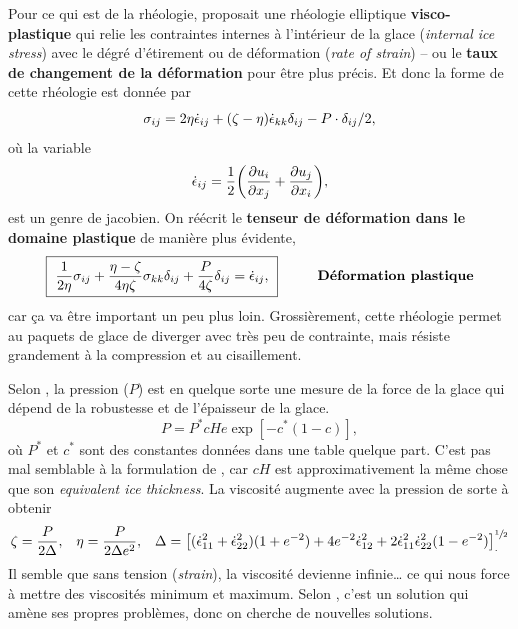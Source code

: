 \documentclass[10pt]{article}
\numberwithin{equation}{section}
\begin{document}
Pour ce qui est de la rhéologie, \Textcite{hibler1979dynamic} proposait une rhéologie elliptique \textbf{visco-plastique} qui relie les contraintes internes à l'intérieur de la glace (\emph{internal ice stress}) avec le dégré  d'étirement ou de déformation (\emph{rate of strain}) -- ou le \textbf{taux de changement de la déformation} pour être plus précis. 
Et donc la forme de cette rhéologie est donnée par
\begin{equation}
\label{eq:orgd8ec2a5}
   \sigma_{ij} = 2 \eta \dot{\epsilon}_{ij} + \qty(\zeta - \eta) \dot{\epsilon}_{kk} \delta_{ij} - P \cdot\delta_{ij}/2,
\end{equation}
où la variable
\begin{equation}
   \dot{\epsilon}_{ij} = \frac{1}{2} \qty(\pdv{u_i}{x_j}+\pdv{u_j}{x_i}),
\end{equation}
est un genre de jacobien.
On réécrit le \textbf{tenseur de déformation dans le domaine plastique} de manière plus évidente,
\begin{equation}
\label{eq:orgf317cd4}
   \boxed{\ \frac{1}{2\eta} \sigma_{ij} + \frac{\eta-\zeta}{4\eta\zeta} \sigma_{kk}\delta_{ij} + \frac{P}{4\zeta} \delta_{ij} = \dot{\epsilon}_{ij},\ }\hspace{1cm}\text{\textbf{Déformation plastique}}
\end{equation}
car ça va être important un peu plus loin.
Grossièrement, cette rhéologie permet au paquets de glace de diverger avec très peu de contrainte, mais résiste grandement à la compression et au cisaillement.\bigskip

Selon \Textcite{hunke1997elastic}, la pression (\(P\)) est en quelque sorte une mesure de la force de la glace qui dépend de la robustesse et de l'épaisseur de la glace.
\begin{equation}
   P = P^\ast c He \exp[-c^\ast(1-c)],
\end{equation}
où \(P^\ast\) et \(c^\ast\) sont des constantes données dans une table quelque part.
C'est pas mal semblable à la formulation de \Textcite{hibler1979dynamic}, car \(cH\) est approximativement la même chose que son \emph{equivalent ice thickness}.
La viscosité augmente avec la pression de sorte à obtenir
\begin{align}
   \zeta = \frac{P}{2\Delta}, && \eta = \frac{P}{2\Delta e^2}, && \Delta = \qty[(\dot{\epsilon}^2_{11} + \dot{\epsilon}^2_{22})(1 + e^{-2}) + 4 e^{-2}\dot{\epsilon}^2_{12} + 2 \dot{\epsilon}^2_{11}\dot{\epsilon}^2_{22}(1-e^{-2})]^{\sfrac{1}{2}}_.
\end{align}
Il semble que sans tension (\emph{strain}), la viscosité devienne infinie\ldots{} ce qui nous force à mettre des viscosités minimum et maximum.
Selon \citeauthor*{hunke1997elastic}, c'est un solution qui amène ses propres problèmes, donc on cherche de nouvelles solutions.\bigskip
\end{document}
